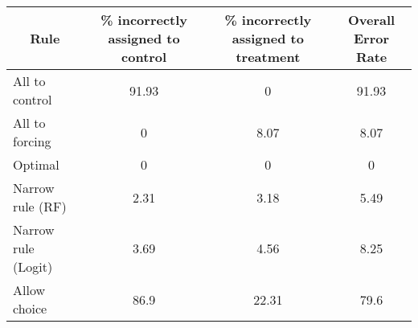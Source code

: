 \begin{tabular}{lccc}
\toprule
\multicolumn{1}{c}{Rule} & \% incorrectly assigned to control  & \% incorrectly assigned to treatment & Overall Error Rate \\
\midrule
\midrule
All to control & 91.93 & 0     & 91.93 \\
All to forcing & 0     & 8.07  & 8.07 \\
Optimal & 0     & 0     & 0 \\
Narrow rule (RF) & 2.31  & 3.18  & 5.49 \\
Narrow rule (Logit) & 3.69  & 4.56  & 8.25 \\
Allow choice & 86.9  & 22.31 & 79.6 \\
\bottomrule
\bottomrule
\end{tabular}%
